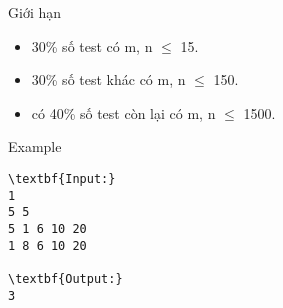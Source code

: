Giới hạn
\begin{itemize}
	\item 30\% số test có m, n  $\le$  15.
	\item 30\% số test khác có m, n  $\le$  150.
	\item có 40\% số test còn lại có m, n  $\le$  1500.
\end{itemize}
Example
\begin{verbatim}
\textbf{Input:}
1
5 5
5 1 6 10 20
1 8 6 10 20

\textbf{Output:}
3
\end{verbatim}